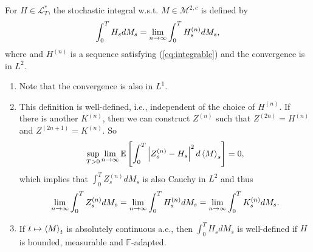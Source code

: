\begin{defn}
    For $H \in \mathcal{L}^*_T$, the stochastic integral w.s.t. $M \in \mathcal{M}^{2,c}$ is defined by
    \begin{equation*}
        \int_0^T H_s dM_s = \lim_{n \rightarrow \infty} \int_0^T H_s^{(n)}dM_s,
    \end{equation*}
    where and $H^{(n)}$ is a sequence satisfying (\ref{eq:integrable}) and the convergence is in $L^2$.
\end{defn}
\begin{rmk}
    \begin{enumerate}[label=(\roman*)]
        \item Note that the convergence is also in $L^1$.
        \item This definition is well-defined, i.e., independent of the choice of $H^{(n)}$. If there is another $K^{(n)}$, then we can construct $Z^{(n)}$ such that $Z^{(2n)} = H^{(n)}$ and $Z^{(2n+1)} = K^{(n)}$. So
        \begin{equation*}
            \sup_{T > 0} \lim_{n \rightarrow \infty} \mathbb{E}\left[\int_0^T \left\lvert Z_s^{(n)} - H_s\right\lvert^2 d\left\langle M \right\rangle_s\right] = 0,
        \end{equation*}
        which implies that $\int_0^T Z_s^{(n)} d M_s$ is also Cauchy in $L^2$ and thus
        \begin{equation*}
            \lim_{n \rightarrow \infty} \int_0^T Z_s^{(n)}dM_s = \lim_{n \rightarrow \infty} \int_0^T H_s^{(n)}dM_s = \lim_{n \rightarrow \infty} \int_0^T K_s^{(n)}dM_s.
        \end{equation*}
        \item If $t \mapsto \left\langle M \right\rangle_t$ is absolutely continuous a.e., then $\int_0^T H_s dM_s$ is well-defined if $H$ is bounded, measurable and $\mathbb{F}$-adapted.
    \end{enumerate}
\end{rmk}


